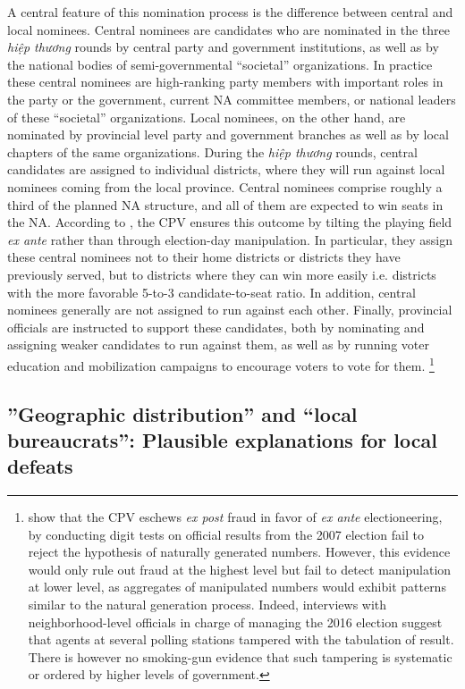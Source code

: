 \documentclass[12pt]{article}\usepackage[]{graphicx}\usepackage[]{color}
\newcommand{\1}{\mathbbm{1}}
\begin{document}
A central feature of this nomination process is the difference between central and local nominees. Central nominees are candidates who are nominated in the three \textit{hiệp thương} rounds by central party and government institutions, as well as by the national bodies of semi-governmental ``societal'' organizations. In practice these central nominees are high-ranking party members with important roles in the party or the government, current NA committee members, or national leaders of these ``societal'' organizations. Local nominees, on the other hand, are nominated by provincial level party and government branches as well as by local chapters of the same organizations. During the \textit{hiệp thương} rounds, central candidates are assigned to individual districts, where they will run against local nominees coming from the local province. Central nominees comprise roughly a third of the planned NA structure, and all of them are expected to win seats in the NA. According to \cite{MaleskySchuler2011}, the CPV ensures this outcome by tilting the playing field \textit{ex ante} rather than through election-day manipulation. In particular, they assign these central nominees not to their home districts or districts they have previously served, but to districts where they can win more easily i.e. districts with the more favorable 5-to-3 candidate-to-seat ratio. In addition,  central nominees generally are not assigned to run against each other. Finally, provincial officials are instructed to support these candidates, both by nominating and assigning  weaker candidates to run against them, as well as by running voter education and mobilization campaigns to encourage voters to vote for them. \footnote{\cite{MaleskySchuler2011} show that the CPV eschews \textit{ex post} fraud in favor of \textit{ex ante} electioneering, by conducting digit tests on official results from the 2007 election fail to reject the hypothesis of naturally generated numbers. However, this evidence would only rule out fraud at the highest level but fail to detect manipulation at lower level, as aggregates of manipulated numbers would exhibit patterns similar to the natural generation process. Indeed, interviews with neighborhood-level officials in charge of managing the 2016 election suggest that agents at several polling stations tampered with the tabulation of result. There is however no smoking-gun evidence that such tampering is systematic or ordered by higher levels of government.}

\subsection{''Geographic distribution'' and ``local bureaucrats'': Plausible explanations for local defeats}
\end{document}
